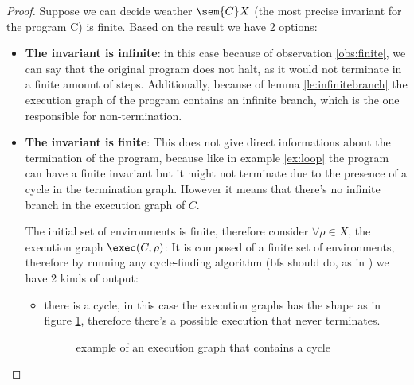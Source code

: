 \begin{proof}
  Suppose we can decide weather \(\sem{C}X\) (the most precise
  invariant for the program C) is finite. Based on the result we have
  2 options:
  \begin{itemize}
  \item \textbf{The invariant is infinite}: in this case because of
    observation \ref{obs:finite}, we can say that the original program
    does not halt, as it would not terminate in a finite amount of
    steps. Additionally, because of lemma \ref{le:infinitebranch} the
    execution graph of the program contains an infinite branch, which
    is the one responsible for non-termination.
  \item \textbf{The invariant is finite}: This does not give direct
    informations about the termination of the program, because like in
    example \ref{ex:loop} the program can have a finite invariant but
    it might not terminate due to the presence of a cycle in the
    termination graph. However it means that there's no infinite
    branch in the execution graph of \(C\).

    The initial set of environments is finite, therefore consider
    \(\forall \rho \in X\), the execution graph \(\exec(C, \rho)\): It
    is composed of a finite set of environments, therefore by running
    any cycle-finding algorithm (bfs should do, as in
    \cite{cormen2022introduction}) we have 2 kinds of output:
    \begin{itemize}
    \item there is a cycle, in this case the execution graphs has the
      shape as in figure \ref{fig:cycle}, therefore there's a possible
      execution that never terminates.
      \begin{figure}
        \centering
        \usetikzlibrary{positioning}
        \usetikzlibrary{graphs}
        \caption{example of an execution graph that contains a
          cycle}\label{fig:cycle}
      \end{figure}
    \end{itemize}
  \end{itemize}
\end{proof}
